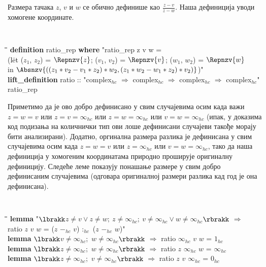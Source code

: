 Размера тачака $z$, $v$ и $w$ се обично дефинише као
$\frac{z-v}{z-w}$. Наша дефиниција уводи хомогене координате. {\tt
\begin{tabbing}
\hspace{5mm}\=\hspace{5mm}\=\hspace{5mm}\=\hspace{5mm}\=\hspace{5mm}\=\kill
{\bf definition} ratio\_rep {\bf where} "ratio\_rep z v w =  \\
\>(l\=et ($z_1$, $z_2$) = $\Repnzv{z}$; ($v_1$, $v_2$) = $\Repnzv{v}$; ($w_1$, $w_2$) = $\Repnzv{w}$ \\
\>\>in $\Absnzv{((z_1*v_2 - v_1*z_2)*w_2, (z_1*w_2 - w_1*z_2)*v_2)}$)"\\
{\bf lift\_definition} ratio :: "complex$_{hc}$ $\Rightarrow$ complex$_{hc}$ $\Rightarrow$ complex$_{hc}$ $\Rightarrow$ complex$_{hc}$" \\
 ratio\_rep
\end{tabbing}
} 
\noindent Приметимо да је ово добро дефинисано у свим случајевима осим
када важи $z=w=v$ или $z=v=\infty_{hc}$ или $z=w=\infty_{hc}$ или
$v=w=\infty_{hc}$ (ипак, у доказима код подизања на количнички тип ови
лоше дефинисани случајеви такође морају бити анализирани). Додатно,
оргинална размера разлика је дефинисана у свим случајевима осим када
$z=w=v$ или $z=\infty_{hc}$ или $v=w=\infty_{hc}$, тако да наша
дефиниција у хомогеним координатама природно проширује оригиналну
дефиницију. Следеће леме показују понашање размере у свим добро
дефинисаним случајевима (одговара оригиналној размери разлика кад год
је она дефинисана). {\tt
\begin{tabbing}
\hspace{5mm}\=\hspace{5mm}\=\hspace{5mm}\=\hspace{5mm}\=\hspace{5mm}\=\kill
{\bf lemma} "$\lbrakk$$z \neq v \vee z \neq w;\ z \neq \infty_{hc};\  v \neq \infty_{hc} \vee w \neq \infty_{hc}$$\rbrakk$ $\Longrightarrow$ \\
\>ratio $z$ $v$ $w$ = ($z$ $-_{hc}$ $v$) $:_{hc}$ ($z$ $-_{hc}$ $w$)"\\
{\bf lemma} $\lbrakk$$v \neq \infty_{hc}$;\ $w \neq \infty_{hc}$$\rbrakk$ $\Longrightarrow$ ratio $\infty_{hc}$ $v$ $w$ = $1_{hc}$\\
{\bf lemma} $\lbrakk$$z \neq \infty_{hc}$;\ $w \neq \infty_{hc}$$\rbrakk$ $\Longrightarrow$ ratio $z$ $\infty_{hc}$ $w$ = $\infty_{hc}$\\
{\bf lemma} $\lbrakk$$z \neq \infty_{hc}$;\ $v \neq \infty_{hc}$$\rbrakk$ $\Longrightarrow$ ratio $z$ $v$ $\infty_{hc}$ = $0_{hc}$
\end{tabbing}
}

